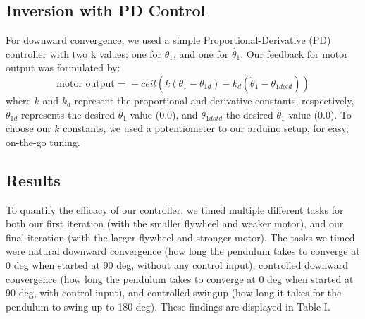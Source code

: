 \documentclass[conference]{IEEEtran}
\begin{document}
\subsection{Inversion with PD Control}
For downward convergence, we used a simple Proportional-Derivative (PD) controller with two k values: one for $\theta_1$, and one for $\dot{\theta_1}$. Our feedback for motor output was formulated by: $$\textrm{motor output = } - ceil(k(\theta_1-\theta_{1d})-k_d (\dot{\theta}_1-\theta_{1dotd}))$$ where $k$ and $k_d$ represent the proportional and derivative constants, respectively, $\theta_{1d}$ represents the desired $\theta_1$ value (0.0), and $\theta_{1dotd}$ the desired $\dot{\theta}_1$ value (0.0). To choose our $k$ constants, we used a potentiometer to our arduino setup, for easy, on-the-go tuning. 

\subsection{Results}
To quantify the efficacy of our controller, we timed multiple different tasks for both our first iteration (with the smaller flywheel and weaker motor), and our final iteration (with the larger flywheel and stronger motor). The tasks we timed were natural downward convergence (how long the pendulum takes to converge at 0 deg when started at 90 deg, without any control input), controlled downward convergence (how long the pendulum takes to converge at 0 deg when started at 90 deg, with control input), and controlled swingup (how long it takes for the pendulum to swing up to 180 deg). These findings are displayed in Table I.
\end{document}

